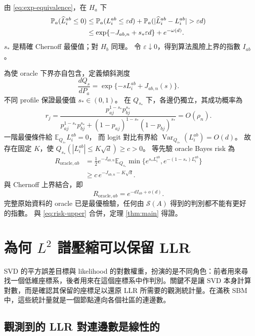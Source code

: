 \documentclass[11pt,a4paper]{article}
\theoremstyle{zhplain}
\numberwithin{equation}{section}
\newcommand{\E}{\mathbb E}
\newcommand{\PP}{\mathbb P}
\newcommand{\cS}{\mathcal S}
\begin{document}
由 \eqref{eq:exp-equivalence}，在 \(H_a\) 下
\begin{align}
 \PP_a(\widehat L_i^{ab}\le0)
 &\le\PP_a(L_i^{ab}\le\varepsilon d)
   +\PP_a(|\widehat L_i^{ab}-L_i^{ab}|>\varepsilon d)\notag\\
 &\le \exp\{-J_{ab,n}+s_*\varepsilon d\}+e^{-\omega(d)}.
 \label{eq:risk-upper}
\end{align}
\(s_*\) 是精確 Chernoff 最優值；對 \(H_b\) 同理。
令 \(\varepsilon\downarrow0\)，得到算法風險上界的指數 \(I_{ab}\)。

為使 oracle 下界亦自包含，定義傾斜測度
\[
 \frac{dQ_s}{dP_a}=\exp\{-sL_i^{ab}+J_{ab,n}(s)\}.
\]
不同 profile 保證最優值 \(s_*\in(0,1)\)。
在 \(Q_{s_*}\) 下，各邊仍獨立，其成功概率為
\[
 r_j=
 \frac{p_{aj}^{1-s_*}p_{bj}^{s_*}}
 {p_{aj}^{1-s_*}p_{bj}^{s_*}
 +(1-p_{aj})^{1-s_*}(1-p_{bj})^{s_*}}
 =O(\rho_n).
\]
一階最優條件給 \(\E_{Q_{s_*}}L_i^{ab}=0\)，
而 logit 對比有界給
\(\operatorname{Var}_{Q_{s_*}}(L_i^{ab})=O(d)\)。
故存在固定 \(K\)，使
\(Q_{s_*}(|L_i^{ab}|\le K\sqrt d)\ge c>0\)。
等先驗 oracle Bayes risk 為
\begin{align*}
 R_{\mathrm{oracle},ab}
 &=\frac12e^{-J_{ab,n}}
 \E_{Q_{s_*}}\min\{e^{s_*L_i^{ab}},
                         e^{-(1-s_*)L_i^{ab}}\}\\
 &\ge c\,e^{-J_{ab,n}-K\sqrt d}.
\end{align*}
與 Chernoff 上界結合，即
\[
 R_{\mathrm{oracle},ab}=e^{-dI_{ab}+o(d)}.
\]
完整原始資料的 oracle 已是最優檢驗，任何由
\(\cS(A)\) 得到的判別都不能有更好的指數。
與 \eqref{eq:risk-upper} 合併，定理 \ref{thm:main} 得證。

\section{為何 \texorpdfstring{\(L^2\)}{L2} 譜壓縮可以保留 LLR}
\label{sec:l2-and-llr}

SVD 的平方誤差目標與 likelihood 的對數權重，扮演的是不同角色：前者用來尋找一個低維座標系，後者用來在這個座標系中作判別。關鍵不是讓 SVD 本身計算對數，而是確認其保留的座標足以還原 LLR 所需要的觀測統計量。在滿秩 SBM 中，這些統計量就是一個節點連向各個社區的連邊數。

\subsection{觀測到的 LLR 對連邊數是線性的}
\end{document}
